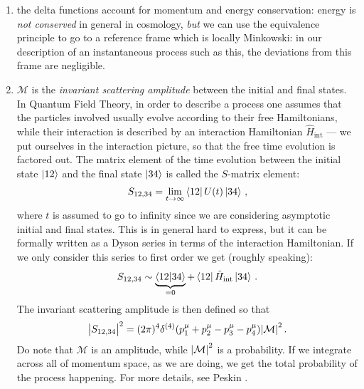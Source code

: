 \documentclass[main.tex]{subfiles}
\begin{document}
\begin{enumerate}
  \item the delta functions account for momentum and energy conservation: energy is \emph{not conserved} in general in cosmology, \emph{but} we can use the equivalence principle to go to a reference frame which is locally Minkowski: in our description of an instantaneous process such as this, the deviations from this frame are negligible.
  \item \(\mathcal{M}\) is the \emph{invariant scattering amplitude} between the initial and final states.
  In Quantum Field Theory, in order to describe a process one assumes that the particles involved usually evolve according to their free Hamiltonians, while their interaction is described by an interaction Hamiltonian \(\hat{H} _{\text{int}}\) --- we put ourselves in the interaction picture, so that the free time evolution is factored out. The matrix element of the time evolution between the initial state \(\ket{12}\) and the final state \(\ket{34}\) is called the \(S\)-matrix element:
  \begin{align}
  S_{12, 34} = \lim_{t \rightarrow \infty } \bra{12} U(t) \ket{34} 
  \,,
  \end{align}
  where \(t\) is assumed to go to infinity since we are considering asymptotic initial and final states. This is in general hard to express, but it can be formally written as a Dyson series in terms of the interaction Hamiltonian. If we only consider this series to first order we get (roughly speaking):
  \begin{align}
  S_{12, 34} \sim \underbrace{\braket{12}{34}}_{=0} + \bra{12} \hat{H}_{\text{int}} \ket{34}
  \,.
  \end{align}
  The invariant scattering amplitude is then defined so that 
  \begin{align}
  \abs{S_{12, 34}}^2 = (2 \pi)^{4} \delta^{(4)} (p^{\mu }_{1} + p^{\mu }_{2} - p^{\mu }_{3} - p^{\mu }_{4}) \abs{\mathcal{M}}^2
  \,.
  \end{align}
  Do note that \(\mathcal{M}\) is an amplitude, while \(\abs{\mathcal{M}}^2\) is a probability. 
  If we integrate across all of momentum space, as we are doing, we get the total probability of the process happening. For more details, see Peskin \cite[sections 7.2, 7.3]{peskinConceptsElementaryParticle2019}.


\end{enumerate}
\end{document}
